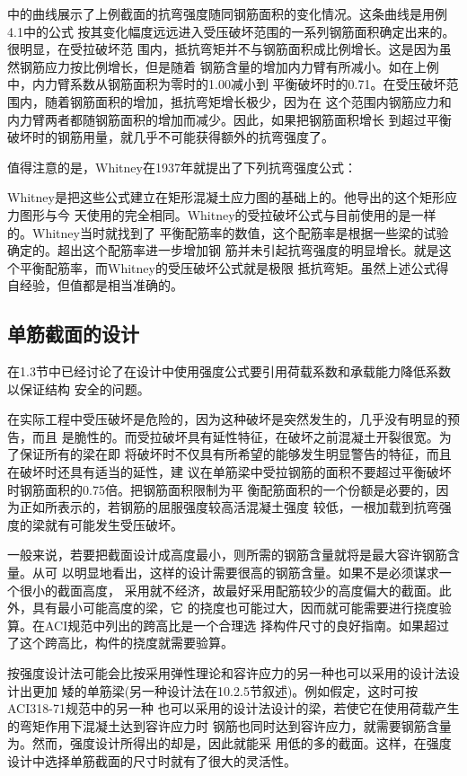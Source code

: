 \documentclass[12pt,a4paper]{book}
\begin{document}
中的曲线展示了上例截面的抗弯强度随同钢筋面积的变化情况。这条曲线是用例4.1中的公式
按其变化幅度远远进入受压破坏范围的一系列钢筋面积确定出来的。很明显，在受拉破坏范
围内，抵抗弯矩并不与钢筋面积成比例增长。这是因为虽然钢筋应力按比例增长，但是随着
钢筋含量的增加内力臂有所减小。如在上例中，内力臂系数从钢筋面积为零时的1.00减小到
平衡破坏时的0.71。在受压破坏范围内，随着钢筋面积的增加，抵抗弯矩增长极少，因为在
这个范围内钢筋应力和内力臂两者都随钢筋面积的增加而减少。因此，如果把钢筋面积增长
到超过平衡破坏时的钢筋用量，就几乎不可能获得额外的抗弯强度了。

值得注意的是，Whitney在1937年就提出了下列抗弯强度公式：

Whitney是把这些公式建立在矩形混凝土应力图的基础上的。他导出的这个矩形应力图形与今
天使用的完全相同。Whitney的受拉破坏公式与目前使用的是一样的。Whitney当时就找到了
平衡配筋率的数值，这个配筋率是根据一些梁的试验确定的。超出这个配筋率进一步增加钢
筋并未引起抗弯强度的明显增长。就是这个平衡配筋率，而Whitney的受压破坏公式就是极限
抵抗弯矩。虽然上述公式得自经验，但值都是相当准确的。

\subsection{单筋截面的设计}

在1.3节中已经讨论了在设计中使用强度公式要引用荷载系数和承载能力降低系数以保证结构
安全的问题。

在实际工程中受压破坏是危险的，因为这种破坏是突然发生的，几乎没有明显的预告，而且
是脆性的。而受拉破坏具有延性特征，在破坏之前混凝土开裂很宽。为了保证所有的梁在即
将破坏时不仅具有所希望的能够发生明显警告的特征，而且在破坏时还具有适当的延性，建
议在单筋梁中受拉钢筋的面积不要超过平衡破坏时钢筋面积的0.75倍。把钢筋面积限制为平
衡配筋面积的一个份额是必要的，因为正如所表示的，若钢筋的屈服强度较高活混凝土强度
较低，一根加载到抗弯强度的梁就有可能发生受压破坏。

一般来说，若要把截面设计成高度最小，则所需的钢筋含量就将是最大容许钢筋含量。从可
以明显地看出，这样的设计需要很高的钢筋含量。如果不是必须谋求一个很小的截面高度，
采用就不经济，故最好采用配筋较少的高度偏大的截面。此外，具有最小可能高度的梁，它
的挠度也可能过大，因而就可能需要进行挠度验算。在ACI规范中列出的跨高比是一个合理选
择构件尺寸的良好指南。如果超过了这个跨高比，构件的挠度就需要验算。

按强度设计法可能会比按采用弹性理论和容许应力的另一种也可以采用的设计法设计出更加
矮的单筋梁(另一种设计法在10.2.5节叙述)。例如假定，这时可按ACI318-71规范中的另一种
也可以采用的设计法设计的梁，若使它在使用荷载产生的弯矩作用下混凝土达到容许应力时
钢筋也同时达到容许应力，就需要钢筋含量为。然而，强度设计所得出的却是，因此就能采
用低的多的截面。这样，在强度设计中选择单筋截面的尺寸时就有了很大的灵活性。
\end{document}
